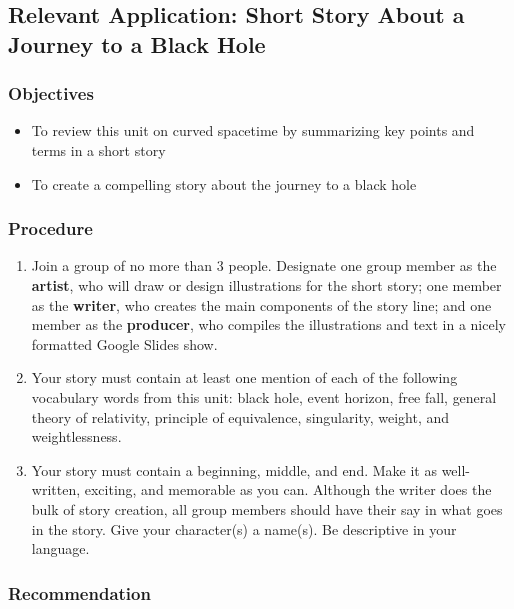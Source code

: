 \documentclass{article}
\numberwithin{equation}{section}
\numberwithin{figure}{section}
\begin{document}
\clearpage

\subsection{Relevant Application: Short Story About a Journey to a Black Hole} \label{hxYdNl}

\subsubsection*{Objectives}

\begin{itemize}
\setlength\itemsep{-1ex}
    \item To review this unit on curved spacetime by summarizing key points and terms in a short story
    \item To create a compelling story about the journey to a black hole
\end{itemize}

\subsubsection*{Procedure}

\begin{enumerate}
\setlength\itemsep{-1ex}
    \item Join a group of no more than 3 people. Designate one group member as the \textbf{artist}, who will draw or design illustrations for the short story; one member as the \textbf{writer}, who creates the main components of the story line; and one member as the \textbf{producer}, who compiles the illustrations and text in a nicely formatted Google Slides show.
    \item Your story must contain at least one mention of each of the following vocabulary words from this unit: \gls{black hole}, \gls{event horizon}, \gls{free fall}, \gls{general theory of relativity}, \gls{principle of equivalence}, \gls{singularity}, \gls{weight}, and \gls{weightlessness}.
    \item Your story must contain a beginning, middle, and end. Make it as well-written, exciting, and memorable as you can. Although the writer does the bulk of story creation, all group members should have their say in what goes in the story. Give your character(s) a name(s). Be descriptive in your language.
\end{enumerate}

\subsubsection*{Recommendation}
\end{document}
